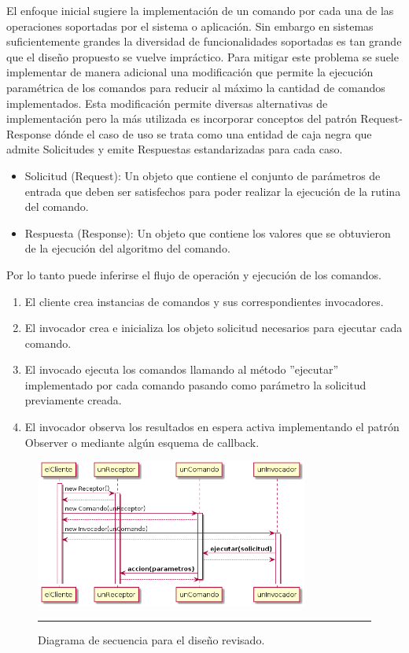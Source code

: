 El enfoque inicial sugiere la implementación de un comando
por cada una de las operaciones soportadas por el sistema o aplicación. Sin embargo en sistemas suficientemente grandes la diversidad de funcionalidades soportadas es tan grande que el diseño propuesto se vuelve impráctico.
Para mitigar este problema se suele implementar de manera adicional una modificación que permite la ejecución paramétrica de los comandos para reducir al máximo la cantidad de comandos implementados.
Esta modificación permite diversas alternativas de implementación pero la más utilizada es incorporar conceptos del patrón Request-Response dónde el caso de uso se trata como una entidad de caja negra que admite Solicitudes y emite Respuestas estandarizadas para cada caso.
\begin{itemize}
	\item Solicitud (Request): Un objeto que contiene el conjunto de parámetros de entrada que deben ser satisfechos para poder realizar la ejecución de la rutina del comando.
	\item Respuesta (Response): Un objeto que contiene los valores que se obtuvieron de la ejecución del algoritmo del comando.
\end{itemize}

Por lo tanto puede inferirse el flujo de operación y ejecución de los comandos.

\begin{enumerate}
\item El cliente crea instancias de comandos y sus correspondientes invocadores. 
\item El invocador crea e inicializa los objeto solicitud necesarios para ejecutar cada comando.
\item El invocado ejecuta los comandos llamando al método ''ejecutar'' implementado por cada comando pasando como parámetro la solicitud previamente creada.
\item El invocador observa los resultados en espera activa implementando el patrón Observer o mediante algún esquema de callback.
\end{enumerate}

\begin{figure}[htbp]
	\centering
	\includegraphics[width=0.8\textwidth]{Figures/uml_sequence_commander_req_resp.png}
	\rule{35em}{1pt}
	\caption[Commander Review]{Diagrama de secuencia para el diseño revisado.}
	\label{fig:uml_commander_sequence_req_resp}
\end{figure}

